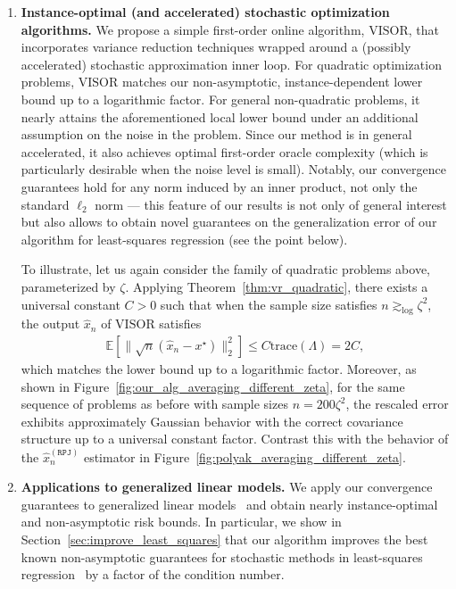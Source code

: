 \documentclass[11pt,twoside]{article}
\numberwithin{equation}{section}
\newcommand{\EE}{\mathbb{E}}
\newcommand{\trace}[1]{\mathrm{trace}\left(#1\right)}
\newcommand{\1}{\mathbf{1}}
\theoremstyle{remark}
\theoremstyle{plain}
\newcommand{\algname}{\mathrm{VISOR}}
\newcommand{\rpj}{\widehat x_n^{(\texttt{RPJ})}}
\begin{document}
\begin{enumerate}
    		\item \textbf{Instance-optimal (and accelerated) stochastic optimization algorithms.} We propose a simple first-order online algorithm, $\algname$, that incorporates variance reduction techniques wrapped around a (possibly accelerated) stochastic approximation inner loop. For quadratic optimization problems, $\algname$ matches our non-asymptotic, instance-dependent lower bound up to a logarithmic factor. For general non-quadratic problems, it nearly attains the aforementioned local lower bound under an additional assumption on the noise in the problem. Since our method is in general accelerated, it also achieves optimal first-order oracle complexity (which is particularly desirable when the noise level is small). Notably, our convergence guarantees hold for any norm induced by an inner product, not only the standard $\ell_2$ norm --- this feature of our results is not only of general interest but also allows to obtain novel guarantees on the generalization error of our algorithm for least-squares regression (see the point below).
    
    To illustrate, let us again consider the family of quadratic problems above, parameterized by $\zeta$. Applying Theorem~\ref{thm:vr_quadratic}, there exists a universal constant $C > 0$ such that when the sample size satisfies $n \gtrsim_{\log} \zeta^2$, the output $\widehat{x}_n$ of $\algname$ satisfies
    \begin{align*}
    	\EE[\|\sqrt{n}(\widehat x_n - x^\star)\|_2^2] \le C \trace{\Lambda} = 2C,
    \end{align*}
    which matches the lower bound up to a logarithmic factor. Moreover, as shown in Figure~\ref{fig:our_alg_averaging_different_zeta}, for the same sequence of problems as before with sample sizes $n = 200 \zeta^2$, the rescaled error exhibits approximately Gaussian behavior with the correct covariance structure up to a universal constant factor. 
    Contrast this with the behavior of the $\rpj$ estimator in Figure~\ref{fig:polyak_averaging_different_zeta}. 
    
	
    
    
    \item \textbf{Applications to generalized linear models.} We apply our convergence guarantees to generalized linear models~\cite{nelder1972generalized} and obtain nearly instance-optimal and non-asymptotic risk bounds. In particular, we show in Section~\ref{sec:improve_least_squares} that our algorithm improves the best known non-asymptotic guarantees for stochastic methods in least-squares regression~\cite{jain2018accelerating} by a factor of the condition number. 

	\end{enumerate}
\end{document}

